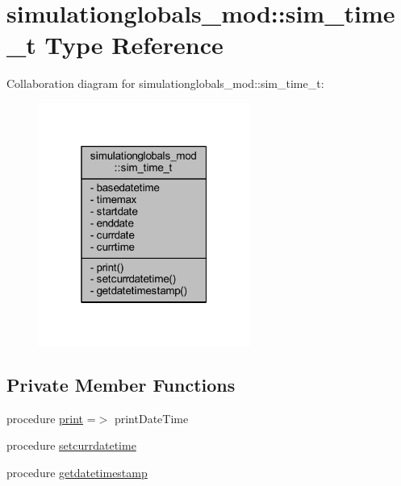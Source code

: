 \hypertarget{structsimulationglobals__mod_1_1sim__time__t}{}\section{simulationglobals\+\_\+mod\+:\+:sim\+\_\+time\+\_\+t Type Reference}
\label{structsimulationglobals__mod_1_1sim__time__t}


Collaboration diagram for simulationglobals\+\_\+mod\+:\+:sim\+\_\+time\+\_\+t\+:\nopagebreak
\begin{figure}[H]
\begin{center}
\leavevmode
\includegraphics[width=196pt]{structsimulationglobals__mod_1_1sim__time__t__coll__graph}
\end{center}
\end{figure}
\subsection*{Private Member Functions}
\begin{DoxyCompactItemize}
\item 
procedure \mbox{\hyperlink{structsimulationglobals__mod_1_1sim__time__t_a24aa321faaaf3f94343ae2161cf873cd}{print}} =$>$ print\+Date\+Time
\item 
procedure \mbox{\hyperlink{structsimulationglobals__mod_1_1sim__time__t_adb083c01d6e79f6bdc715a4cd85a155d}{setcurrdatetime}}
\item 
procedure \mbox{\hyperlink{structsimulationglobals__mod_1_1sim__time__t_ada67e9a9bc56121febffba51622be61e}{getdatetimestamp}}
\end{DoxyCompactItemize}
